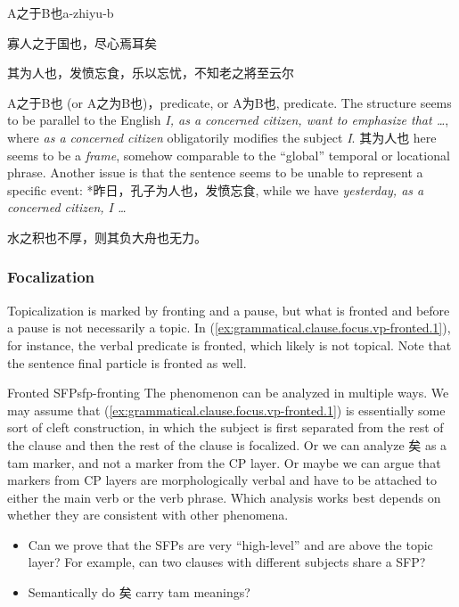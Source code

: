 \documentclass[UTF8, a4paper, oneside, scheme=plain, 12pt]{ctexrep}
\newcommand{\form}[1]{\emph{#1}}
\begin{document}
\begin{todobox}{A之于B也}{a-zhiyu-b}
    \begin{exe}
        \ex 寡人之于国也，尽心焉耳矣
    \end{exe}

    \begin{exe}
        \ex 其为人也，发愤忘食，乐以忘忧，不知老之將至云尔
    \end{exe}

    A之于B也 (or A之为B也)，predicate, or A为B也, predicate.
    The structure seems to be parallel to the English
    \form{I, as a concerned citizen, want to emphasize that \dots},
    where \form{as a concerned citizen} obligatorily modifies the subject \form{I}.
    其为人也 here seems to be a \emph{frame}, somehow comparable to the ``global'' temporal or locational phrase.
    Another issue is that the sentence seems to be unable to represent a specific event:
    *昨日，孔子为人也，发愤忘食, while we have \form{yesterday, as a concerned citizen, I \dots}
    
    \begin{exe}
        \ex 水之积也不厚，则其负大舟也无力。
    \end{exe}

\end{todobox}

\subsubsection{Focalization}

Topicalization is marked by fronting and a pause,
but what is fronted and before a pause is not necessarily a topic.
In (\ref{ex:grammatical.clause.focus.vp-fronted.1}),
for instance, the verbal predicate is fronted,
which likely is not topical.
Note that the sentence final particle is fronted as well.

\begin{todobox}{Fronted SFP}{sfp-fronting}
    The phenomenon can be analyzed in multiple ways.
    We may assume that (\ref{ex:grammatical.clause.focus.vp-fronted.1}) is essentially some sort of cleft construction,
    in which the subject is first separated from the rest of the clause
    and then the rest of the clause is focalized.
    Or we can analyze 矣 as a \ac{tam} marker, and not a marker from the CP layer.
    Or maybe we can argue that markers from CP layers are morphologically verbal
    and have to be attached to either the main verb or the verb phrase.
    Which analysis works best depends on whether they are consistent with other phenomena.
    \begin{itemize}
        \item Can we prove that the SFPs are very ``high-level'' and are above the topic layer? For example, can two clauses with different subjects share a SFP?
        \item Semantically do 矣 carry \ac{tam} meanings?
    \end{itemize}
\end{todobox}
\end{document}
